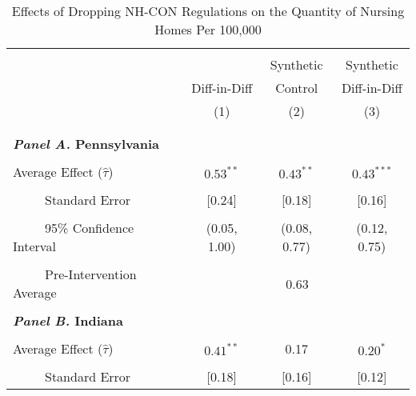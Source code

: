 \documentclass[../Main.tex]{subfiles}
\begin{document}



\newpage
\null
\vfill
\begin{table}[htbp]\centering \footnotesize
\def\sym#1{\ifmmode^{#1}\else\(^{#1}\)\fi}
\captionsetup{width=.69\textwidth}
\caption{\centering Effects of Dropping NH-CON Regulations on the Quantity of Nursing Homes Per 100,000}
\label{tab:ave_results_q_nh}
\setlength{\tabcolsep}{10pt}
\begin{tabular}{l*{3}{c}}
\hline\hline
\\[-2ex]
&\multicolumn{1}{c}{}&\multicolumn{1}{c}{Synthetic}&\multicolumn{1}{c}{Synthetic}\\
&\multicolumn{1}{c}{Diff-in-Diff}&\multicolumn{1}{c}{Control}&\multicolumn{1}{c}{Diff-in-Diff}\\
&\multicolumn{1}{c}{(1)}&\multicolumn{1}{c}{(2)}&\multicolumn{1}{c}{(3)}\\
\\[-2ex]
\hline
\\[-.1ex]
\multicolumn{4}{l}{\textbf{\textit{Panel A.} Pennsylvania}}\\
\\[-1.5ex]
\multicolumn{1}{l}{Average Effect ($\hat{\tau}$)}&   \multicolumn{1}{c}{$0.53^{**}$}&   \multicolumn{1}{c}{$0.43^{**}$}&  \multicolumn{1}{c}{$0.43^{***}$}\\
\\[-2ex]
\multicolumn{1}{l}{\ \ \ \ \ Standard Error}  &\multicolumn{1}{c}{[0.24]}&\multicolumn{1}{c}{[0.18]}&\multicolumn{1}{c}{[0.16]}\\
\\[-2ex]
\multicolumn{1}{l}{\ \ \ \ \ 95\% Confidence Interval}&   \multicolumn{1}{c}{(0.05, 1.00)}&   \multicolumn{1}{c}{(0.08, 0.77)}&   \multicolumn{1}{c}{(0.12, 0.75)}\\
\\[-2ex]
\multicolumn{1}{l}{\ \ \ \ \ Pre-Intervention Average}&   \multicolumn{3}{c}{0.63}\\
\\[-.1ex]
\multicolumn{4}{l}{\textbf{\textit{Panel B.} Indiana}}\\
\\[-1.5ex]
\multicolumn{1}{l}{Average Effect ($\hat{\tau}$)}&   \multicolumn{1}{c}{$0.41^{**}$}&   \multicolumn{1}{c}{0.17}&  \multicolumn{1}{c}{$0.20^{*}$}\\
\\[-2ex]
\multicolumn{1}{l}{\ \ \ \ \ Standard Error}  &\multicolumn{1}{c}{[0.18]}&\multicolumn{1}{c}{[0.16]}&\multicolumn{1}{c}{[0.12]}\\

\end{tabular}
\end{table}
\end{document}
